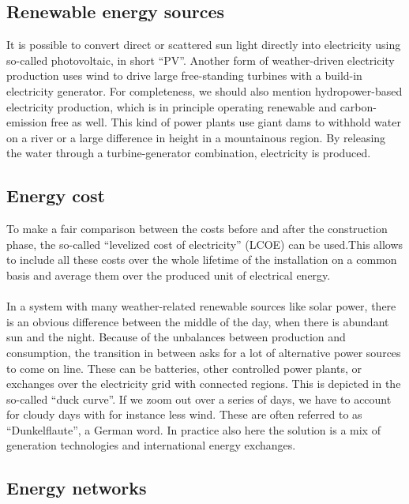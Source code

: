 \documentclass[../summary.tex]{subfiles}
\begin{document}
	\subsection{Renewable energy sources}
	
	It is possible to convert direct or scattered sun light directly into electricity using so-called photovoltaic, in short “PV”. Another form of weather-driven electricity production uses wind to drive large free-standing turbines with a build-in electricity generator. For completeness, we should also mention hydropower-based electricity production, which is in principle operating renewable and carbon-emission free as well. This kind of power plants use giant dams to withhold water on a river or a large difference in height in a mountainous region. By releasing the water through a turbine-generator combination, electricity is produced.
	
	\subsection{Energy cost}
	
	To make a fair comparison between the costs before and after the construction phase, the so-called “levelized cost of electricity” (LCOE) can be used.This allows to include all these costs over the whole lifetime of the installation on a common basis and average them over the produced unit of electrical energy. 
	\\\\
	In a system with many weather-related renewable sources like solar power, there is an obvious difference between the middle of the day, when there is abundant sun and the night. Because of the unbalances between production and consumption, the transition in between asks for a lot of alternative power sources to come on line. These can be batteries, other controlled power plants, or exchanges over the electricity grid with connected regions. This is depicted in the so-called “duck curve”. If we zoom out over a series of days, we have to account for cloudy days with for instance less wind. These are often referred to as “Dunkelflaute”, a German word. In practice also here the solution is a mix of generation technologies and international energy exchanges.
	
	\subsection{Energy networks}
	
\end{document}

